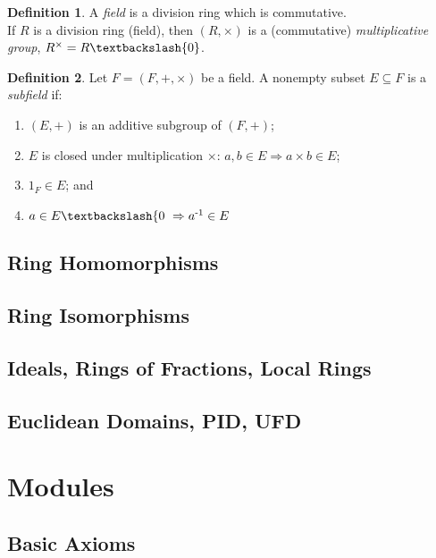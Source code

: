 \documentclass[a4paper,sfsidenotes,openany]{tufte-book}
\theoremstyle{definition}
\newtheorem{definition}{Definition}[section]
\begin{document}
\begin{fullwidth}
\begin{definition}
A \textit{{\color{blue} field}} is a division ring which is commutative.\\
If $R$ is a division ring (field), then $(R, \times)$ is a (commutative) \textit{{\color{blue} multiplicative group}}, $R^\times = R \textbackslash \{0\}$.\\
\end{definition}
\>

\begin{definition}
Let $F = (F, +, \times) $ be a field. A nonempty subset $E \subseteq F$ is a \textit{{\color{blue} subfield}} if:
\begin{enumerate}[label=(\roman*),leftmargin=0pt, itemindent=4em, align=left]
\item $(E, +)$ is an additive subgroup of $(F, +)$;
\item $E$ is closed under multiplication $\times$: $a, b \in E \Rightarrow a \times b \in E$;
\item $1_F \in E$; and
\item $a \in E \textbackslash \{0\ \Rightarrow a \textsuperscript{-1} \in E$
\end{enumerate}
\end{definition}
\>

\section{Ring Homomorphisms}

\section{Ring Isomorphisms}

\section{Ideals, Rings of Fractions, Local Rings}

\section{Euclidean Domains, PID, UFD}

\end{fullwidth}

\newpage

\chapter{Modules}
\begin{fullwidth}
\section{Basic Axioms}

\end{fullwidth}
\end{document}
